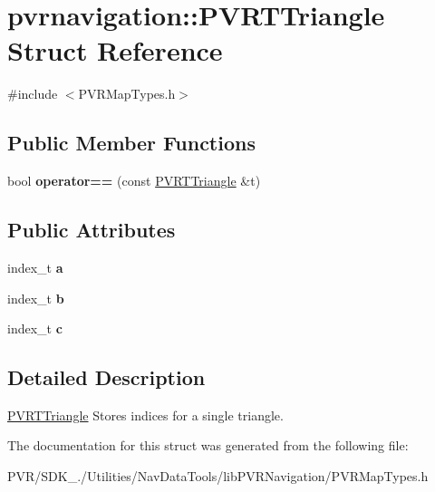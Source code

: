\hypertarget{structpvrnavigation_1_1_p_v_r_t_triangle}{\section{pvrnavigation\+:\+:P\+V\+R\+T\+Triangle Struct Reference}
\label{structpvrnavigation_1_1_p_v_r_t_triangle}
}


{\ttfamily \#include $<$P\+V\+R\+Map\+Types.\+h$>$}

\subsection*{Public Member Functions}
\begin{DoxyCompactItemize}
\item 
\hypertarget{structpvrnavigation_1_1_p_v_r_t_triangle_ae621ec5bd2dbece92887d18861920c18}{bool {\bfseries operator==} (const \hyperlink{structpvrnavigation_1_1_p_v_r_t_triangle}{P\+V\+R\+T\+Triangle} \&t)}\label{structpvrnavigation_1_1_p_v_r_t_triangle_ae621ec5bd2dbece92887d18861920c18}

\end{DoxyCompactItemize}
\subsection*{Public Attributes}
\begin{DoxyCompactItemize}
\item 
\hypertarget{structpvrnavigation_1_1_p_v_r_t_triangle_af7e4680d3b59977088959463f8dcf24c}{index\+\_\+t {\bfseries a}}\label{structpvrnavigation_1_1_p_v_r_t_triangle_af7e4680d3b59977088959463f8dcf24c}

\item 
\hypertarget{structpvrnavigation_1_1_p_v_r_t_triangle_afb20ac55547564970b1e2ba2e6c94894}{index\+\_\+t {\bfseries b}}\label{structpvrnavigation_1_1_p_v_r_t_triangle_afb20ac55547564970b1e2ba2e6c94894}

\item 
\hypertarget{structpvrnavigation_1_1_p_v_r_t_triangle_a6906eab78d7db7f2b699f9017f308edf}{index\+\_\+t {\bfseries c}}\label{structpvrnavigation_1_1_p_v_r_t_triangle_a6906eab78d7db7f2b699f9017f308edf}

\end{DoxyCompactItemize}


\subsection{Detailed Description}


  \hyperlink{structpvrnavigation_1_1_p_v_r_t_triangle}{P\+V\+R\+T\+Triangle}  Stores indices for a single triangle. 

The documentation for this struct was generated from the following file\+:\begin{DoxyCompactItemize}
\item 
P\+V\+R/\+S\+D\+K\+\_./\+Utilities/\+Nav\+Data\+Tools/lib\+P\+V\+R\+Navigation/P\+V\+R\+Map\+Types.\+h\end{DoxyCompactItemize}
